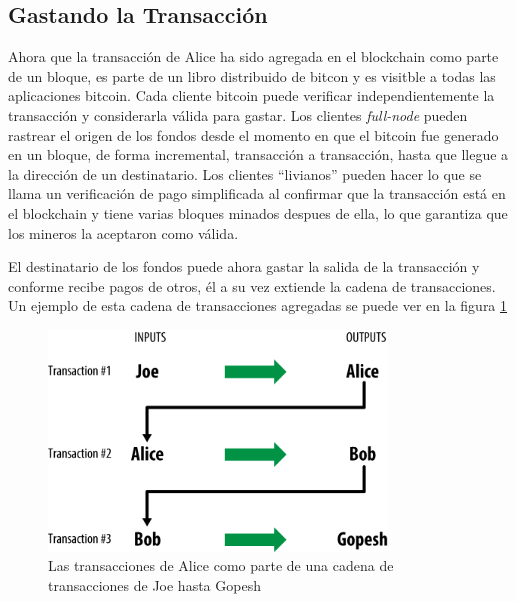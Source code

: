 \documentclass[10pt,journal,compsoc]{IEEEtran}
\begin{document}
\subsection{Gastando la Transacción}
Ahora que la transacción de Alice ha sido agregada en el blockchain como parte de un bloque, es parte de un libro distribuido de bitcon y es visitble a todas las aplicaciones bitcoin. Cada cliente bitcoin puede verificar independientemente la transacción y considerarla válida para gastar. Los clientes \emph{full-node} pueden rastrear el origen de los fondos desde el momento en que el bitcoin fue generado en un bloque, de forma incremental, transacción a transacción, hasta que llegue a la dirección de un destinatario. Los clientes ``livianos'' pueden hacer lo que se llama un verificación de pago simplificada al confirmar que la transacción está en el blockchain y tiene varias bloques minados despues de ella, lo que garantiza que los mineros la aceptaron como válida.

El destinatario de los fondos puede ahora gastar la salida de la transacción y conforme recibe pagos de otros, él a su vez extiende la cadena de transacciones. Un ejemplo de esta cadena de transacciones agregadas se puede ver en la figura \ref{fig:transaction-chain}

\begin{figure}[h]
    \center
    \includegraphics[width=9cm]{transaction-chain}
    \caption{Las transacciones de Alice como parte de una cadena de transacciones de Joe hasta Gopesh}
    \label{fig:transaction-chain}
\end{figure}

\end{document}
